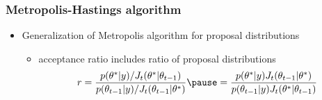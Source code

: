 \documentclass[10pt]{beamer}
\begin{document}
\begin{frame}

\frametitle{Metropolis-Hastings algorithm}

  \begin{itemize}
  \item Generalization of Metropolis algorithm for  proposal distributions
    \begin{itemize}
    \item acceptance ratio includes ratio of proposal distributions
      \begin{equation*}
        r =
        \frac{p(\theta^{*}|y)/J_t(\theta^{*}|\theta_{t-1})}{p(\theta_{t-1}|y)/J_t(\theta_{t-1}|\theta^{*})} \pause =
        \frac{p(\theta^{*}|y)J_t(\theta_{t-1}|\theta^{*})}{p(\theta_{t-1}|y)J_t(\theta^{*}|\theta_{t-1})}
      \end{equation*}
    \end{itemize}
  \end{itemize}

\end{frame}




\end{document}
